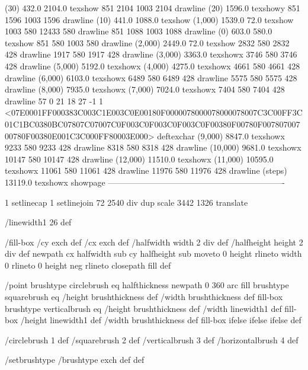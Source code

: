 (30) 432.0 2104.0 texshow
851 2104 1003 2104 drawline
(20) 1596.0 texshowy
851 1596 1003 1596 drawline
(10) 441.0 1088.0 texshow
(1,000) 1539.0 72.0 texshow
1003 580 12433 580 drawline
851 1088 1003 1088 drawline
(0) 603.0 580.0 texshow
851 580 1003 580 drawline
(2,000) 2449.0 72.0 texshow
2832 580 2832 428 drawline
1917 580 1917 428 drawline
(3,000) 3363.0 texshowx
3746 580 3746 428 drawline
(5,000) 5192.0 texshowx
(4,000) 4275.0 texshowx
4661 580 4661 428 drawline
(6,000) 6103.0 texshowx
6489 580 6489 428 drawline
5575 580 5575 428 drawline
(8,000) 7935.0 texshowx
(7,000) 7024.0 texshowx
7404 580 7404 428 drawline
57 0 21 18 27 -1 1 {{<07E0001FF000383C003C1E003C0E00180F0000078000078000078007C3C00FF3C01C1BC0380BC07807C07007C0F003C0F003C0F003C0F00380F00780F00780700700780F00380E001C3C000FF80003E000>}} deftexchar
(9,000) 8847.0 texshowx
9233 580 9233 428 drawline
8318 580 8318 428 drawline
(10,000) 9681.0 texshowx
10147 580 10147 428 drawline
(12,000) 11510.0 texshowx
(11,000) 10595.0 texshowx
11061 580 11061 428 drawline
11976 580 11976 428 drawline
(steps) 13119.0 texshowx
showpage
----------------------------------------------------------------

1 setlinecap 1 setlinejoin
72 2540 div dup scale
3442 1326 translate



/linewidth1 26 def

/fill-box
  { /cy exch def /cx exch def
    /halfwidth width 2 div def
    /halfheight height 2 div def
    newpath
     cx halfwidth sub cy halfheight sub moveto
     0 height rlineto
     width 0 rlineto
     0 height neg rlineto
     closepath
     fill } def

/point
  { brushtype circlebrush eq
     { halfthickness newpath 0 360 arc fill }
     { brushtype squarebrush eq
        { /height brushthickness def
	  /width brushthickness def
	  fill-box }
        { brushtype verticalbrush eq
           { /height brushthickness def
	     /width linewidth1 def
	     fill-box }
           { /height linewidth1 def
	     /width brushthickness def
	     fill-box }
	   ifelse }
        ifelse }
     ifelse } def

/circlebrush     1 def
/squarebrush     2 def
/verticalbrush   3 def
/horizontalbrush 4 def

/setbrushtype { /brushtype exch def } def


